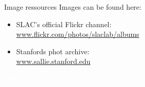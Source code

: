 \documentclass{beamer}
\begin{document}
\begin{frame}{Image ressources}
Images can be found here:
\begin{itemize}
  \item SLAC's official Flickr channel: \\
  \url{www.flickr.com/photos/slaclab/albums}
  \item Stanfords phot archive: \\
  \url{www.sallie.stanford.edu}
\end{itemize}
\end{frame}


\setlength{\unitlength}{\paperwidth}%
\begin{frame}
\textcolor{white}{
\begin{center}
  \LARGE \bfseries Divider page
\end{center}}
\end{frame}
\usebackgroundtemplate{}
\end{document}
